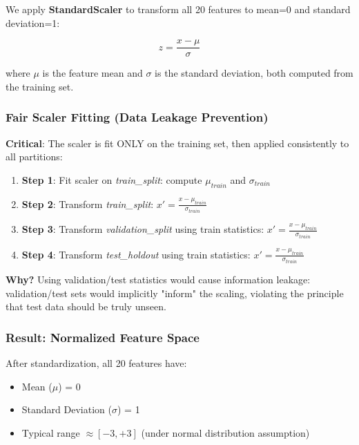 We apply \textbf{StandardScaler} to transform all 20 features to mean=0 and standard deviation=1:

\[
z = \frac{x - \mu}{\sigma}
\]

where $\mu$ is the feature mean and $\sigma$ is the standard deviation, both computed from the training set.

\subsubsection{Fair Scaler Fitting (Data Leakage Prevention)}

\textbf{Critical}: The scaler is fit ONLY on the training set, then applied consistently to all partitions:

\begin{enumerate}
    \item \textbf{Step 1}: Fit scaler on \textit{train\_split}: compute $\mu_{train}$ and $\sigma_{train}$
    \item \textbf{Step 2}: Transform \textit{train\_split}: $x' = \frac{x - \mu_{train}}{\sigma_{train}}$
    \item \textbf{Step 3}: Transform \textit{validation\_split} using train statistics: $x' = \frac{x - \mu_{train}}{\sigma_{train}}$
    \item \textbf{Step 4}: Transform \textit{test\_holdout} using train statistics: $x' = \frac{x - \mu_{train}}{\sigma_{train}}$
\end{enumerate}

\textbf{Why?} Using validation/test statistics would cause information leakage: validation/test sets would implicitly "inform" the scaling, violating the principle that test data should be truly unseen.

\subsubsection{Result: Normalized Feature Space}

After standardization, all 20 features have:
\begin{itemize}
    \item Mean ($\mu$) = 0
    \item Standard Deviation ($\sigma$) = 1
    \item Typical range $\approx [-3, +3]$ (under normal distribution assumption)
\end{itemize}

